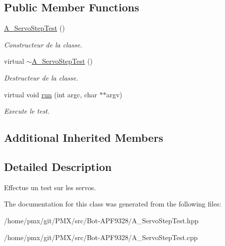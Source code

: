 \subsection*{Public Member Functions}
\begin{DoxyCompactItemize}
\item 
\mbox{\label{classA__ServoStepTest_aa6cfc8145a54a57f5afff8d64af2c810}} 
\hyperlink{classA__ServoStepTest_aa6cfc8145a54a57f5afff8d64af2c810}{A\+\_\+\+Servo\+Step\+Test} ()
\begin{DoxyCompactList}\small\item\em Constructeur de la classe. \end{DoxyCompactList}\item 
\mbox{\label{classA__ServoStepTest_a5ecb592b17617d231f168a3182f1d996}} 
virtual \hyperlink{classA__ServoStepTest_a5ecb592b17617d231f168a3182f1d996}{$\sim$\+A\+\_\+\+Servo\+Step\+Test} ()
\begin{DoxyCompactList}\small\item\em Destructeur de la classe. \end{DoxyCompactList}\item 
\mbox{\label{classA__ServoStepTest_ad98ddd1d901a5ac0c76e4a10a7e1b46c}} 
virtual void \hyperlink{classA__ServoStepTest_ad98ddd1d901a5ac0c76e4a10a7e1b46c}{run} (int argc, char $\ast$$\ast$argv)
\begin{DoxyCompactList}\small\item\em Execute le test. \end{DoxyCompactList}\end{DoxyCompactItemize}
\subsection*{Additional Inherited Members}


\subsection{Detailed Description}
Effectue un test sur les servos. 

The documentation for this class was generated from the following files\+:\begin{DoxyCompactItemize}
\item 
/home/pmx/git/\+P\+M\+X/src/\+Bot-\/\+A\+P\+F9328/A\+\_\+\+Servo\+Step\+Test.\+hpp\item 
/home/pmx/git/\+P\+M\+X/src/\+Bot-\/\+A\+P\+F9328/A\+\_\+\+Servo\+Step\+Test.\+cpp\end{DoxyCompactItemize}
